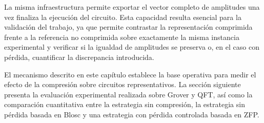 La misma infraestructura permite exportar el vector completo de amplitudes una vez finaliza la ejecución del circuito. Esta capacidad resulta esencial para la validación del trabajo, ya que permite contrastar la representación comprimida frente a la referencia no comprimida sobre exactamente la misma instancia experimental y verificar si la igualdad de amplitudes se preserva o, en el caso con pérdida, cuantificar la discrepancia introducida.

El mecanismo descrito en este capítulo establece la base operativa para medir el efecto de la
compresión sobre circuitos representativos. La sección siguiente presenta la evaluación
experimental realizada sobre Grover y QFT, así como la comparación cuantitativa entre la
estrategia sin compresión, la estrategia sin pérdida basada en Blosc y una estrategia con
pérdida controlada basada en ZFP.
